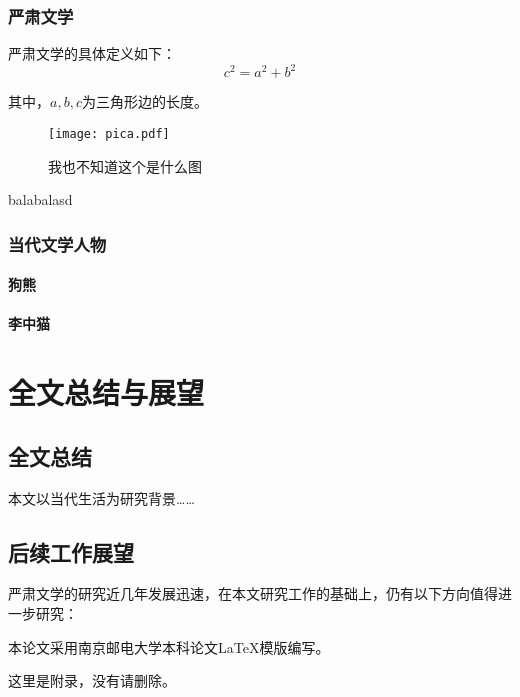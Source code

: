 \documentclass[bachelor]{njupthesis}
\begin{document}
\subsection{严肃文学}
严肃文学的具体定义如下：
\begin{equation}
c^2 = a^2 + b^2
\end{equation}

其中，$a, b, c$为三角形边的长度。

\begin{figure}[h]
\texttt{[image: pica.pdf]}
\caption{我也不知道这个是什么图}
\label{pica}
\end{figure}
balabalasd



\subsection{当代文学人物}

\subsubsection{狗熊}

\subsubsection{李中猫}


\chapter{全文总结与展望}

\section{全文总结}
本文以当代生活为研究背景……

\section{后续工作展望}
严肃文学的研究近几年发展迅速，在本文研究工作的基础上，仍有以下方向值得进一步研究：

\thesisacknowledgement
本论文采用南京邮电大学本科论文\LaTeX 模版编写。



%
% 
%
% 
% 
%

\thesisappendix
这里是附录，没有请删除。
\end{document}
